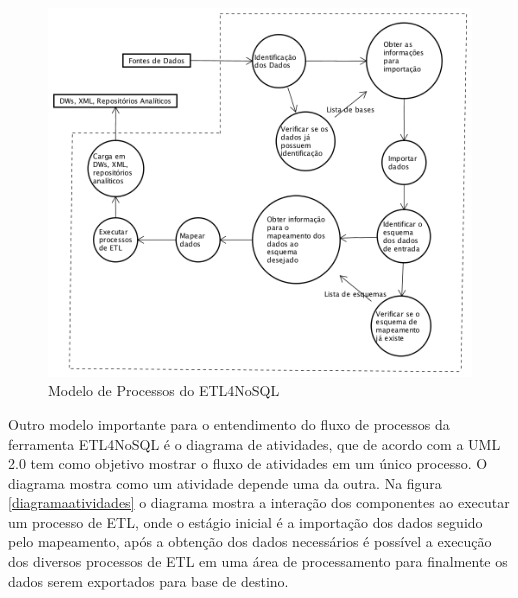 \begin{figure}[h]
	\centering
	\includegraphics[scale=0.6]{fig/modelo_processo.png}
	\caption{Modelo de Processos do ETL4NoSQL}
	\label{modeloprocesso}
\end{figure}

Outro modelo importante para o entendimento do fluxo de processos da ferramenta ETL4NoSQL é o diagrama de atividades, que de acordo com a UML 2.0 tem como objetivo mostrar o fluxo de atividades em um único processo. O diagrama mostra como um atividade depende uma da outra. Na figura \ref{diagramaatividades} o diagrama mostra a interação dos componentes ao executar um processo de ETL, onde o estágio inicial é a importação dos dados seguido pelo mapeamento, após a obtenção dos dados necessários é possível a execução dos diversos processos de ETL em uma área de processamento para finalmente os dados serem exportados para base de destino.


